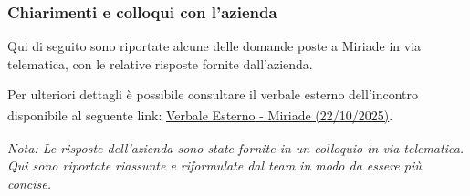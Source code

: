 \documentclass[a4paper,11pt]{article}
\begin{document}
\subsubsection{Chiarimenti e colloqui con l'azienda}
Qui di seguito sono riportate alcune delle domande poste a Miriade in via telematica, con le relative risposte fornite dall'azienda. 

Per ulteriori dettagli è possibile consultare il verbale esterno\textsubscript{} dell'incontro disponibile al seguente link: \href{https://bugbustersunipd.github.io/DocumentazioneSWE/CANDIDATURA/VERBALI/Esterni/VE_2025-10-22%20%5BMiriade%5D/VE_2025-10-22%5BMiriade%5D.pdf}{Verbale Esterno\textsubscript{\scalebox{0.6}{\textbf{G}}} - Miriade (22/10/2025)}.

\begin{center}
\small\textit{Nota: Le risposte dell'azienda sono state fornite in  un colloquio in via telematica. Qui sono riportate riassunte e riformulate dal team in modo da essere più concise.}
\end{center}
\end{document}
